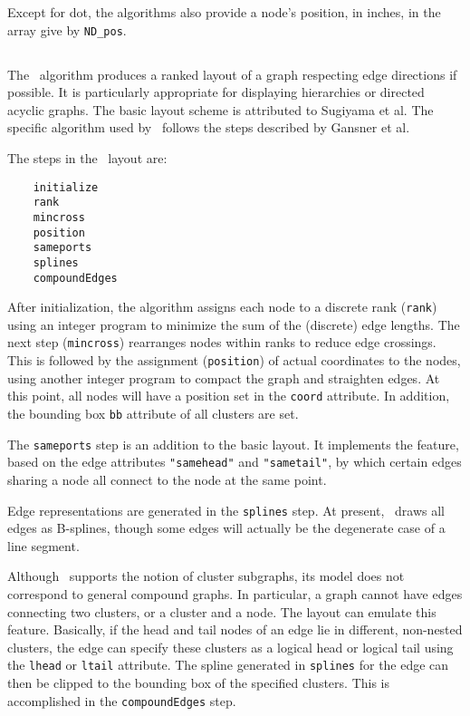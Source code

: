 Except for dot, the algorithms also provide a node's position,
in inches, in the array give by {\tt ND\_pos}.

\subsection{\dot}

The \dot\ algorithm produces a ranked layout of a graph respecting
edge directions if possible. It is particularly appropriate for displaying
hierarchies or directed acyclic graphs. The basic layout scheme
is attributed to Sugiyama et al.\cite{stt} The specific algorithm
used by \dot\ follows the steps described by Gansner et al.\cite{gknv:methods}

The steps in the \dot\ layout are:
\begin{verbatim}
    initialize
    rank
    mincross
    position
    sameports
    splines
    compoundEdges
\end{verbatim}

After initialization, the algorithm
assigns each node to a discrete rank ({\tt rank})
using an integer program to minimize the sum of the (discrete) edge lengths. 
The next step ({\tt mincross}) rearranges nodes within ranks to
reduce edge crossings. This is followed by the assignment ({\tt position})
of actual coordinates to the nodes, using another integer program to
compact the graph and straighten edges. At this point, all nodes will
have a position set in the {\tt coord} attribute. In addition, the
bounding box {\tt bb} attribute of all clusters are set.

The {\tt sameports} step
is an addition to the basic layout. It
implements the feature, based on the edge attributes {\tt "samehead"}
and {\tt "sametail"}, by which certain edges sharing a node all connect
to the node at the same point.

Edge representations are generated in the {\tt splines} step.
At present, \dot\ draws all edges as B-splines, though some edges will
actually be the degenerate case of a line segment.

Although \dot\ supports the notion of cluster subgraphs, its model does
not correspond to general compound graphs. In particular, a graph cannot
have edges connecting two clusters, or a cluster and a node. The
layout can emulate this feature. Basically, if the head and tail nodes
of an edge lie in different, non-nested clusters, the edge can specify
these clusters as a logical head or logical tail using the {\tt lhead} or 
{\tt ltail} attribute. The
spline generated in {\tt splines} for the edge can then be clipped
to the bounding box of the specified clusters.  
This is accomplished in the {\tt compoundEdges} step.

